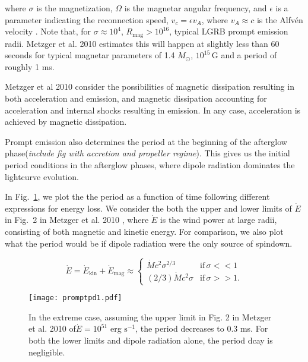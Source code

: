 \documentclass{article}
\begin{document}
where $\sigma$ is the magnetization, $\Omega$ is the magnetar angular frequency, and $\epsilon$ is a parameter indicating the reconnection speed, $v_c=\epsilon v_A$, where $v_A \approx c$ is the Alfv\'en velocity \cite{Metzger:2010pp}. Note that, for $\sigma\approx 10^4$, $R_{\mathrm{mag}} >10^{16}$, typical LGRB prompt emission radii. Metzger et al. 2010 estimates this will happen at slightly less than 60 seconds for typical magnetar parameters of 1.4 $M_{\odot}$, $10^{15}$\,G and a period of roughly 1 ms.

Metzger et al 2010 consider the possibilities of magnetic dissipation resulting in both acceleration and emission, and magnetic dissipation accounting for acceleration and internal shocks resulting in emission. In any case, acceleration is achieved by magnetic dissipation.

Prompt emission also determines the period at the beginning of the afterglow phase(\textit{include fig with accretion and propeller regime}). This gives us the initial period conditions in the afterglow phases, where dipole radiation dominates the lightcurve evolution. 

In Fig.~\ref{fig:7}, we plot the the period as a function of time following different expressions for energy loss. We consider the both the upper and lower limits of $\dot{E}$ in Fig.~2 in Metzger et al. 2010 \cite{Metzger:2010pp}, where $\dot{E}$ is the wind power at large radii, consisting of both magnetic and kinetic energy. For comparison, we also plot what the period would be if dipole radiation were the only source of spindown.

\begin{equation}
\dot{E} =\dot{E}_\mathrm{kin}+\dot{E}_\mathrm{mag} \approx
\begin{cases}
\dot{M} c^2 \sigma^{2/3}& \text{if}\, \sigma<<1 \\
(2/3) \dot{M} c^2 \sigma & \text{if}\, \sigma>>1.
\end{cases}
\end{equation}

\begin{figure}[h!]
\centering
\texttt{[image: promptpd1.pdf]}
\caption{In the extreme case, assuming the upper limit in Fig. 2 in Metzger et al. 2010 of$\dot{E}=10^{51}$ erg $\mathrm{s}^{-1}$, the period decreases to 0.3 ms. For both the lower limits and dipole radiation alone, the period dcay is negligible.}

\label{fig:7}
\end{figure}
\end{document}
